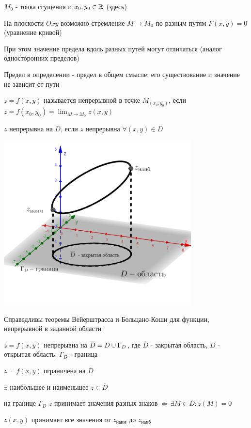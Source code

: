 \documentclass[12pt]{article}
\begin{document}
    $M_0$ - точка сгущения и $x_0, y_0 \in \mathbb{R}$ (здесь)

    \Nota На плоскости $Oxy$ возможно стремление $M \rightarrow M_0$ по разным путям $F(x, y) = 0$ (уравнение кривой)

    При этом значение предела вдоль разных путей могут отличаться (аналог односторонних пределов)

    Предел в определении - предел в общем смысле: его существование и значение не зависит от пути

    \Def $z = f(x, y)$ называется непрерывной в точке $M_(x_0, y_0)$, если $z = f(x_0, y_0) = \lim_{M \to M_0} z(x, y)$

    $z$ непрерывна на $D$, если $z$ непрерывна $\forall (x, y) \in D$

    \includegraphics[height=90mm]{images/calculus_2024_02_28_3}

    \Nota Справедливы теоремы Вейерштрасса и Больцано-Коши для функции, непрерывной в заданной области

    $z = f(x, y)$ непрерывна на $\overline{D} = D \cup \Gamma_D$, где $\overline{D}$ - закрытая область, $D$ - открытая область, $\Gamma_D$ - граница

     $z = f(x, y)$ ограничена на $\overline{D}$

     $\exists$ наибольшее и наименьшее $z \in \overline{D}$

     на границе $\Gamma_D$ $z$ принимает значения разных знаков $\Longrightarrow \exists M \in \overline{D} : z(M) = 0$

     $z(x, y)$ принимает все значения от $z_{\text{наим}}$ до $z_{\text{наиб}}$ \\[1\baselineskip]
\end{document}
